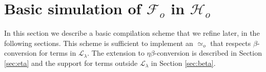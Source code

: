 \documentclass[sigconf,natbib=false,review]{acmart}
\newcommand{\UnifRel}{\ensuremath{\simeq}}
\newcommand{\Uo}{\ensuremath{\UnifRel_o}\xspace}
\newcommand{\llambda}{\ensuremath{\mathcal{L}_\lambda}\xspace}
\newcommand{\Fo}{\ensuremath{\mathcal{F}_{\!o}\xspace}} %
\newcommand{\Ho}{\ensuremath{\mathcal{H}_o}\xspace}
\begin{document}






\section[Compilation: fo\_tm to tm]{Basic simulation of \Fo{} in \Ho{}}
\label{sec:compilation}

In this section we describe a basic compilation scheme that we refine
later, in the following sections. This scheme is sufficient to implement
an \Uo{} that respects $\beta$-conversion for terms in \llambda. The extension to
$\eta\beta$-conversion is described in Section \ref{sec:eta} and the support
for terms outside \llambda in Section \ref{sec:beta}.
\end{document}
